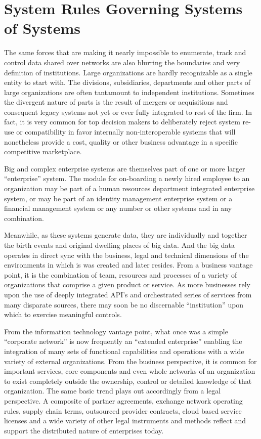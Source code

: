 \section{System Rules Governing Systems of Systems}

The same forces that are making it nearly impossible to enumerate, track and control data shared over networks are also blurring the boundaries and very definition of institutions.
Large organizations are hardly recognizable as a single entity to start with. 
The divisions, subsidiaries, departments and other parts of large organizations are often tantamount to independent institutions.
Sometimes the divergent nature of parts is the result of mergers or acquisitions and consequent legacy systems not yet or ever fully integrated to rest of the firm.
In fact, it is very common for top decision makers to deliberately reject system re-use or compatibility in favor internally non-interoperable systems that will nonetheless provide a cost, quality or other business advantage in a specific competitive marketplace.

Big and complex enterprise systems are themselves part of one or more larger “enterprise” system. The module for on-boarding a newly hired employee to an organization may be part of a human resources department integrated enterprise system, or may be part of an identity management enterprise system or a financial management system or any number or other systems and in any combination.

Meanwhile, as these systems generate data, they are individually and together the birth events and original dwelling places of big data.
And the big data operates in direct sync with the business, legal and technical dimensions of the environments in which is was created and later resides.
From a business vantage point, it is the combination of team, resources and processes of a variety of organizations that comprise a given product or service. 
As more businesses rely upon the use of deeply integrated API’s and orchestrated series of services from many disparate sources, there may soon be no discernable “institution” upon which to exercise meaningful controls.

From the information technology vantage point, what once was a simple “corporate network” is now frequently an “extended enterprise” enabling the integration of many sets of functional capabilities and operations with a wide variety of external organizations.
From the business perspective, it is common for important services, core components and even whole networks of an organization to exist completely outside the ownership, control or detailed knowledge of that organization. The same basic trend plays out accordingly from a legal perspective.
A composite of partner agreements, exchange network operating rules, supply chain terms, outsourced provider contracts, cloud based service licenses and a wide variety of other legal instruments and methods reflect and support the distributed nature of enterprises today.

